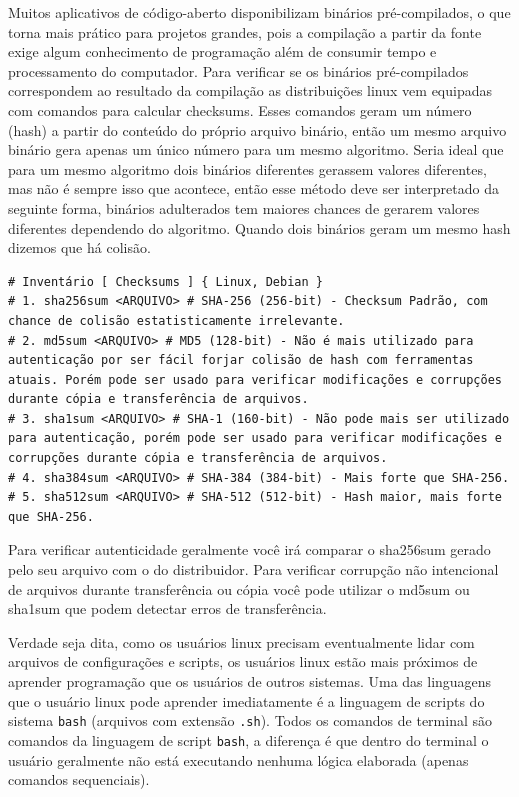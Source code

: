 \documentclass[12pt,a4paper]{article}
\begin{document}
Muitos aplicativos de código-aberto disponibilizam binários pré-compilados, o que torna mais prático para projetos grandes, pois a compilação a partir da fonte exige algum conhecimento de programação além de consumir tempo e processamento do computador. Para verificar se os binários pré-compilados correspondem ao resultado da compilação as distribuições linux vem equipadas com comandos para calcular checksums. Esses comandos geram um número (hash) a partir do conteúdo do próprio arquivo binário, então um mesmo arquivo binário gera apenas um único número para um mesmo algoritmo. Seria ideal que para um mesmo algoritmo dois binários diferentes gerassem valores diferentes, mas não é sempre isso que acontece, então esse método deve ser interpretado da seguinte forma, binários adulterados tem maiores chances de gerarem valores diferentes dependendo do algoritmo. Quando dois binários geram um mesmo hash dizemos que há colisão. \\

\begin{lstlisting}
# Inventário [ Checksums ] { Linux, Debian }
# 1. sha256sum <ARQUIVO> # SHA-256 (256-bit) - Checksum Padrão, com chance de colisão estatisticamente irrelevante. 
# 2. md5sum <ARQUIVO> # MD5 (128-bit) - Não é mais utilizado para autenticação por ser fácil forjar colisão de hash com ferramentas atuais. Porém pode ser usado para verificar modificações e corrupções durante cópia e transferência de arquivos. 
# 3. sha1sum <ARQUIVO> # SHA-1 (160-bit) - Não pode mais ser utilizado para autenticação, porém pode ser usado para verificar modificações e corrupções durante cópia e transferência de arquivos.
# 4. sha384sum <ARQUIVO> # SHA-384 (384-bit) - Mais forte que SHA-256.
# 5. sha512sum <ARQUIVO> # SHA-512 (512-bit) - Hash maior, mais forte que SHA-256.
\end{lstlisting}

\vspace{\baselineskip}

Para verificar autenticidade geralmente você irá comparar o sha256sum gerado pelo seu arquivo com o do distribuidor. Para verificar corrupção não intencional de arquivos durante transferência ou cópia você pode utilizar o md5sum ou sha1sum que podem detectar erros de transferência. \\    

\hspace{\baselineskip}

Verdade seja dita, como os usuários linux precisam eventualmente lidar com arquivos de configurações e scripts, os usuários linux estão mais próximos de aprender programação que os usuários de outros sistemas. Uma das linguagens que o usuário linux pode aprender imediatamente é a linguagem de scripts do sistema \texttt{bash} (arquivos com extensão \texttt{.sh}). Todos os comandos de terminal são comandos da linguagem de script \texttt{bash}, a diferença é que dentro do terminal o usuário geralmente não está executando nenhuma lógica elaborada (apenas comandos sequenciais). \\
\end{document}
